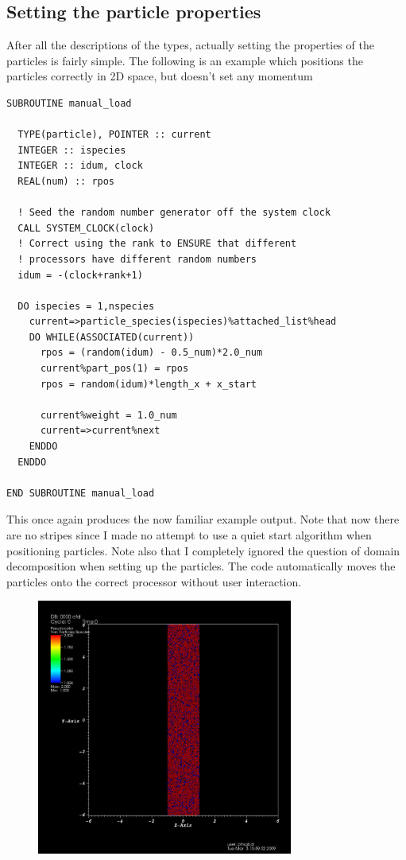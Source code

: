 \documentclass[12pt,a4paper]{article}
\newcommand{\simpleboxverbatim}{\begin{Verbatim}[obeytabs=true,frame=single,
  framerule=0.5mm,rulecolor=\color{warwickmid},formatcom=\color{black}]}
\begin{document}
\subsection{Setting the particle properties}
After all the descriptions of the types, actually setting the properties of
the particles is fairly simple. The following is an example which positions
the particles correctly in 2D space, but doesn't set any momentum

\simpleboxverbatim
SUBROUTINE manual_load

  TYPE(particle), POINTER :: current
  INTEGER :: ispecies
  INTEGER :: idum, clock
  REAL(num) :: rpos

  ! Seed the random number generator off the system clock
  CALL SYSTEM_CLOCK(clock)
  ! Correct using the rank to ENSURE that different
  ! processors have different random numbers
  idum = -(clock+rank+1)

  DO ispecies = 1,nspecies
    current=>particle_species(ispecies)%attached_list%head
    DO WHILE(ASSOCIATED(current))
      rpos = (random(idum) - 0.5_num)*2.0_num
      current%part_pos(1) = rpos
      rpos = random(idum)*length_x + x_start

      current%weight = 1.0_num
      current=>current%next
    ENDDO
  ENDDO

END SUBROUTINE manual_load
\end{Verbatim}

This once again produces the now familiar example output. Note that now there
are no stripes since I made no attempt to use a quiet start algorithm when
positioning particles. Note also that I completely ignored the question of
domain decomposition when setting up the particles. The code automatically
moves the particles onto the correct processor without user interaction.
\begin{figure}[h!]\centering\includegraphics[width=0.75\textwidth]{./images/example4}\end{figure}
\end{document}
